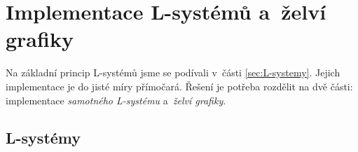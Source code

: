 \section{Implementace L-systémů a~želví grafiky}\label{sec:implementace-lsystemu-a-zelvi-grafiky}

Na základní princip L-systémů jsme se podívali v~části \ref{sec:L-systemy}. Jejich implementace je do jisté míry přímočará. Řešení je potřeba rozdělit na dvě části: implementace \emph{samotného L-systému} a~\emph{želví grafiky}.

\subsection{L-systémy}\label{subsec:implementace-lsystemu}

